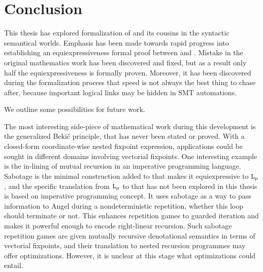 
\chapter{Conclusion}

\label{chp:conc}

This thesis has explored formalization of \GLs{} and its cousins in the syntactic semantical worlds. Emphasis has been made towards rapid progress into establishing an equiexpressiveness formal proof between \GLs{} and \rlGL{}. Mistake in the original mathematics work has been discovered and fixed, but as a result only half the equiexpressiveness is formally proven. Moreover, it has been discovered during the formalization process that speed is not always the best thing to chase after, because important logical links may be hidden in SMT automations.

We outline some possibilities for future work.

The most interesting side-piece of mathematical work during this development is the generalized Beki\v{c} principle, that has never been stated or proved. With a closed-form coordinate-wise nested fixpoint expression, applications could be sought in different domains involving vectorial fixpoints. One interesting example is the in-lining of mutual recursion in an imperative programming language. Sabotage is the minimal construction added to \GL{} that makes it equiexpressive to $\texttt{L}_\mu{}$, and the specific translation from $\texttt{L}_\mu{}$ to \GLs{} that has not been explored in this thesis is based on imperative programming concept. It uses sabotage as a way to pass information to Angel during a nondeterministic repetition, whether this loop should terminate or not. This enhances repetition games to guarded iteration and makes it powerful enough to encode right-linear recursion. Such sabotage repetition games are given mutually recursive denotational semantics in terms of vectorial fixpoints, and their translation to nested recursion programmes may offer optimizations. However, it is unclear at this stage what optimizations could entail.